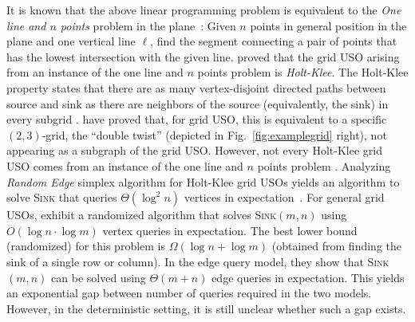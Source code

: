 \documentclass[runningheads,a4paper]{llncs}
\newcommand{\sink}{\textsc{Sink}\xspace}
\newcommand{\sinkmn}{\textsc{Sink}$(m,n)$\xspace}
\begin{document}
It is known that the above linear programming problem is equivalent to the \emph{One line and $n$ points} problem in the plane~\cite{linepoint,welzl2001entering}:
Given $n$ points in general position in the plane and one vertical line $\ell$, find the segment connecting a pair of points that has the lowest intersection with the given line. 
\citet{linepoint} proved that the grid USO arising from an instance of the one line and $n$ points problem is \emph{Holt-Klee}.
The Holt-Klee property states that there are as many vertex-disjoint directed
paths between source and sink as there are neighbors of the source (equivalently, the sink) in every subgrid \cite{holtklee}.
\citet{grid05} have proved that, for grid USO, this is equivalent to a specific $(2,3)$-grid, the ``double twist'' (depicted in Fig.~\ref{fig:examplegrid} right),
not appearing as a subgraph of the grid USO.
However, not every Holt-Klee grid USO comes from an instance of the one line and $n$ points problem \cite{grid05}.
Analyzing \emph{Random Edge} simplex algorithm for Holt-Klee grid USOs yields an algorithm to solve \sink that queries $\Theta(\log^2 n)$ vertices in expectation~\cite{linepoint,grid05,falkthesis}.
For general grid USOs, \citet{grid08} exhibit a randomized algorithm that solves \sinkmn using $O(\log n\cdot  \log m)$ vertex queries in expectation.
The best lower bound (randomized) for this problem is $\Omega(\log n + \log m)$ (obtained from finding the sink of a single row or column).
In the edge query model, they show that \sinkmn can be solved using $\Theta(m+n)$ edge queries in expectation. 
This yields an exponential gap between number of queries required in the two models. 
However, in the deterministic setting, it is still unclear whether such a gap exists.

\end{document}
